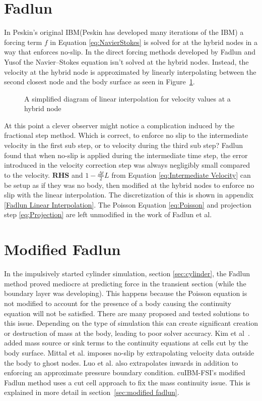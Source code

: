 \section{Fadlun}
In Peskin's\cite{Peskin:1972gh} original IBM(Peskin has developed many iterations of the IBM) a forcing term $f$ in Equation \eqref{eq:NavierStokes} is solved for at the hybrid nodes in a way that enforces no-slip. 
In the direct forcing methods developed by Fadlun\cite{Fadlun:2000fl} and Yusof\cite{MohdYusof:1997wh} the Navier--Stokes equation isn't solved at the hybrid nodes. 
Instead, the velocity at the hybrid node is approximated by linearly interpolating between the second closest node and the body surface as seen in Figure~\ref{fig:2}. 
\begin{figure}[!htb]
	\centering
	
	\caption{A simplified diagram of linear interpolation for velocity values at a hybrid node}
	\label{fig:2}
\end{figure}
At this point a clever observer might notice a complication induced by the fractional step method. 
Which is correct, to enforce no slip to the intermediate velocity in the first sub step, or to velocity during the third sub step? 
Fadlun found that when no-slip is applied during the intermediate time step, the error introduced in the velocity correction step was always negligibly small compared to the velocity. 
$\textbf{RHS}$ and $1-\frac{\Delta t}{2}L$ from Equation \eqref{eq:Intermediate Velocity} can be setup as if they was no body, then modified at the hybrid nodes to enforce no slip with the linear interpolation. 
The discretization of this is shown in appendix \ref{Fadlun Linear Interpolation}. 
The Poisson Equation \ref{eq:Poisson} and projection step \ref{eq:Projection} are left unmodified in the work of Fadlun et al. 

\section{Modified Fadlun} 
In the impulsively started cylinder simulation, section \ref{sec:cylinder}, the Fadlun method proved mediocre at predicting force in the transient section (while the boundary layer was developing). 
This happens because the Poisson equation is not modified to account for the presence of a body causing the continuity equation will not be satisfied. 
There are many proposed and tested solutions to this issue. 
Depending on the type of simulation this can create significant creation or destruction of mass at the body, leading to poor solver accuracy.
Kim et al~\cite{kim2001immersed}. added mass source or sink terms to the continuity equations at cells cut by the body surface. 
Mittal et al\cite{mittal2008versatile}. imposes no-slip by extrapolating velocity data outside the body to ghost nodes. 
Luo et al\cite{Luo:2012gx}. also extrapolates inwards in addition to enforcing an approximate pressure boundary condition. 
cuIBM-FSI's modified Fadlun method uses a cut cell approach to fix the mass continuity issue. 
This is explained in more detail in section~\ref{sec:modified fadlun}.

